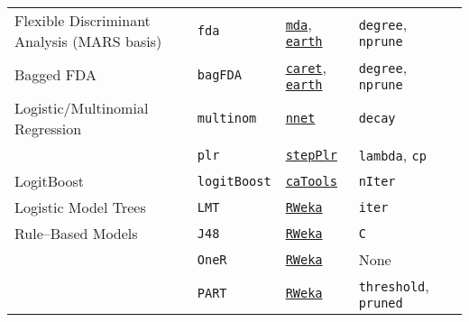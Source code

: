 \documentclass[12pt]{article}
\begin{document}
\begin{landscape}
\begin{longtable}{lllll}
         
      Flexible Discriminant Analysis (MARS basis) &
         \texttt{fda} & 
             {\tt \href{http://cran.r-project.org/web/packages/mda/index.html}{mda}},  {\tt \href{http://cran.r-project.org/web/packages/earth/index.html}{earth}}       & 
            \texttt{degree}, \texttt{nprune} & \\

\rowcolor[rgb]{.95, .95, .95}                 
      Bagged FDA &
         \texttt{bagFDA} & 
             {\tt \href{http://cran.r-project.org/web/packages/caret/index.html}{caret}},   {\tt \href{http://cran.r-project.org/web/packages/earth/index.html}{earth}}      & 
            \texttt{degree}, \texttt{nprune} & \\   
            
      Logistic/Multinomial Regression &
         \texttt{multinom} & 
             {\tt \href{http://cran.r-project.org/web/packages/nnet/index.html}{nnet}}     & 
            \texttt{decay}& \\   
      
           
   &
         \texttt{plr} & 
             {\tt \href{http://cran.r-project.org/web/packages/stepPlr/index.html}{stepPlr}}     & 
            \texttt{lambda}, \texttt{cp} & \\     
            
\rowcolor[rgb]{.95, .95, .95}         
      LogitBoost &      
         \texttt{logitBoost} & 
             {\tt \href{http://cran.r-project.org/web/packages/caTools/index.html}{caTools}}      &          
            \texttt{nIter} & \\              
            
               
      Logistic Model Trees &
         \texttt{LMT} & 
            {\tt \href{http://cran.r-project.org/web/packages/RWeka/index.html}{RWeka}}   & 
            \texttt{iter}  & \\  

\rowcolor[rgb]{.95, .95, .95}               
      Rule--Based Models &
         \texttt{J48} & 
           {\tt \href{http://cran.r-project.org/web/packages/RWeka/index.html}{RWeka}}   & 
            \texttt{C} & \\  
            
\rowcolor[rgb]{.95, .95, .95}               
       &
         \texttt{OneR} & 
           {\tt \href{http://cran.r-project.org/web/packages/RWeka/index.html}{RWeka}}   & 
            None  & \\  
        
\rowcolor[rgb]{.95, .95, .95}               
       &
         \texttt{PART} & 
           {\tt \href{http://cran.r-project.org/web/packages/RWeka/index.html}{RWeka}}   & 
            \texttt{threshold}, \texttt{pruned} &  \\  
            

\end{longtable}
\end{landscape}
\end{document}
